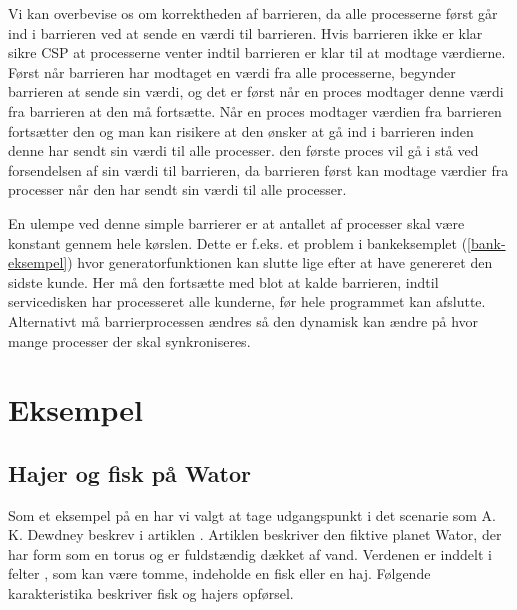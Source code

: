 Vi kan overbevise os om korrektheden af barrieren, da alle processerne først går ind i barrieren ved at sende en værdi til barrieren. Hvis barrieren ikke er klar sikre CSP at processerne venter indtil barrieren er klar til at modtage værdierne. Først når barrieren har modtaget en værdi fra alle processerne, begynder barrieren at sende sin værdi, og det er først når en proces modtager denne værdi fra barrieren at den må fortsætte. Når en proces modtager værdien fra barrieren fortsætter den og man kan risikere at den ønsker at gå ind i barrieren inden denne har sendt sin værdi til alle processer. den første proces vil gå i stå ved forsendelsen af sin værdi til barrieren, da barrieren først kan modtage værdier fra processer når den har sendt sin værdi til alle processer.

En ulempe ved denne simple barrierer er at antallet af processer skal være konstant gennem hele kørslen.
Dette er f.eks. et problem i bankeksemplet (\cref{bank-eksempel}) hvor generatorfunktionen kan slutte lige efter at have genereret den sidste kunde. Her må den fortsætte med blot at kalde barrieren, indtil servicedisken har processeret alle kunderne, før hele programmet kan afslutte. Alternativt må barrierprocessen ændres så den dynamisk kan ændre på hvor mange processer der skal synkroniseres. 


\section{Eksempel}


\subsection{Hajer og fisk på Wator} Som et eksempel på en \des har vi valgt at 
tage  udgangspunkt i det scenarie som A. K. Dewdney
beskrev i artiklen \cite{wator}. Artiklen beskriver den
fiktive planet Wator, der har form som en torus og er fuldstændig
dækket af vand. Verdenen er inddelt i felter \cite[20]{wator}, som kan være tomme, indeholde en
fisk eller en haj. Følgende karakteristika beskriver fisk og hajers
opførsel.

